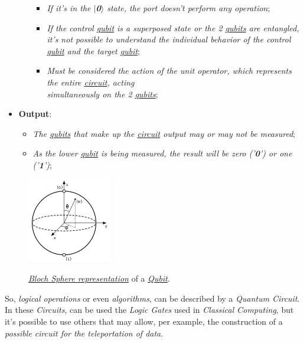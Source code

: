 \documentclass[conference]{IEEEtran}
\begin{document}
\begin{itemize}
\begin{itemize}
\begin{itemize}
            \item \textit{If it's in the \textbf{$\mid$0$\rangle$} state, the port doesn't perform any operation};
            \item \textit{If the control \href{https://en.wikipedia.org/wiki/Qubit}{qubit} is a superposed state or the 2 \href{https://en.wikipedia.org/wiki/Qubit}{qubits} are entangled, it's not possible to understand the individual behavior of the control \href{https://en.wikipedia.org/wiki/Qubit}{qubit} and the target \href{https://en.wikipedia.org/wiki/Qubit}{qubit}};
            \item \textit{Must be considered the action of the unit operator, which represents the entire \href{https://en.wikipedia.org/wiki/Circuit}{circuit}, acting \\simultaneously on the 2 \href{https://en.wikipedia.org/wiki/Qubit}{qubits}};
        \end{itemize}
    \end{itemize}
    \item \textbf{Output}:
    \begin{itemize}
        \item \textit{The \href{https://en.wikipedia.org/wiki/Qubit}{qubits} that make up the \href{https://en.wikipedia.org/wiki/Circuit}{circuit} output may or may not be measured};
        \item \textit{As the lower \href{https://en.wikipedia.org/wiki/Qubit}{qubit} is being measured, the result will be zero ('\textbf{0}') or one ('\textbf{1}')};
    \end{itemize}
\end{itemize}

\begin{figure}[htbp]
\centerline{\href{https://en.wikipedia.org/wiki/Qubit}{\includegraphics{imgs/fig-6.png}}}
\caption{\href{https://en.wikipedia.org/wiki/Bloch_sphere}{\textit{Bloch Sphere representation}} of a \href{https://en.wikipedia.org/wiki/Qubit}{\textit{Qubit}}.}
\label{fig}
\end{figure}

\newpage

So, \textit{logical operations} or even \textit{algorithms}, can be described by a \textit{Quantum Circuit}. In these \textit{Circuits}, can be used the \textit{Logic Gates} used in \textit{Classical Computing}, but it's possible to use others that may allow, per example, the construction of a \textit{possible circuit for the teleportation of data}.
\end{document}
